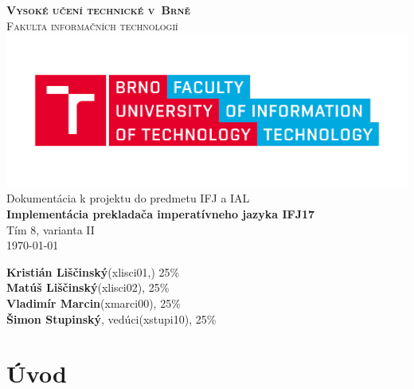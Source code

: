 \documentclass[11pt,a4paper]{article}
\begin{document}
\begin{titlepage}

	\begin{center}
		{\textbf{\Huge\textsc{Vysoké učení technické v~Brně}}} \\
		\bigskip
		{\huge\textsc{Fakulta informačních technologií}}
		\bigskip
		\includegraphics[scale=0.15]{logo}
		\huge{Dokumentácia k projektu do predmetu  IFJ a IAL} \\
		\medskip
		{\textbf{\Huge{Implementácia prekladača imperatívneho jazyka IFJ17}}} \\
		\medskip
		\huge{Tím 8, varianta II} \\
		\medskip
		\today
	\end{center}

\vfill

\noindent
\Large{\textbf{Kristián Liščinský}\hfill (xlisci01,) 25\%\\\textbf{Matúš Liščinský}\hfill (xlisci02), 25\% \\\textbf{Vladimír Marcin}\hfill (xmarci00), 25\% \\ \textbf{Šimon Stupinský}, vedúci\hfill  (xstupi10), 25\%}
\indent
\end{titlepage}

\tableofcontents
\newpage
\section{Úvod}
\end{document}

